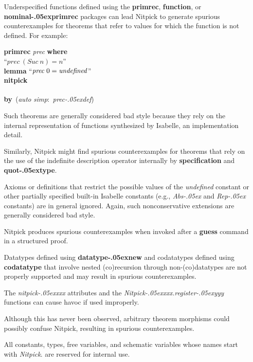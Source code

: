 \documentclass[a4paper,12pt]{article}
\renewcommand\_{\hbox{\textunderscore\kern-.05ex}}
\begin{document}
\begin{enum}
\item[\labelitemi] Underspecified functions defined using the \textbf{primrec},
\textbf{function}, or \textbf{nominal\_\allowbreak primrec} packages can lead
Nitpick to generate spurious counterexamples for theorems that refer to values
for which the function is not defined. For example:

\prew
\textbf{primrec} \textit{prec} \textbf{where} \\
``$\textit{prec}~(\textit{Suc}~n) = n$'' \\[2\smallskipamount]
\textbf{lemma} ``$\textit{prec}~0 = \textit{undefined\/}$'' \\
\textbf{nitpick} \\[2\smallskipamount]
 \nopagebreak\\[2\smallskipamount]
\textbf{by}~(\textit{auto simp}:~\textit{prec\_def})
\postw

Such theorems are generally considered bad style because they rely on the
internal representation of functions synthesized by Isabelle, an implementation
detail.

\item[\labelitemi] Similarly, Nitpick might find spurious counterexamples for
theorems that rely on the use of the indefinite description operator internally
by \textbf{specification} and \textbf{quot\_type}.

\item[\labelitemi] Axioms or definitions that restrict the possible values of the
\textit{undefined} constant or other partially specified built-in Isabelle
constants (e.g., \textit{Abs\_} and \textit{Rep\_} constants) are in general
ignored. Again, such nonconservative extensions are generally considered bad
style.

\item[\labelitemi] Nitpick produces spurious counterexamples when invoked after a
\textbf{guess} command in a structured proof.

\item[\labelitemi] Datatypes defined using \textbf{datatype\_new} and
codatatypes defined using \textbf{codatatype} that involve nested (co)recursion
through non-(co)datatypes are not properly supported and may result in spurious
counterexamples.

\item[\labelitemi] The \textit{nitpick\_xxx} attributes and the
\textit{Nitpick\_xxx.register\_yyy} functions can cause havoc if used
improperly.

\item[\labelitemi] Although this has never been observed, arbitrary theorem
morphisms could possibly confuse Nitpick, resulting in spurious counterexamples.

\item[\labelitemi] All constants, types, free variables, and schematic variables
whose names start with \textit{Nitpick}{.} are reserved for internal use.
\end{enum}

\let\em=\sl
{}

\end{document}
